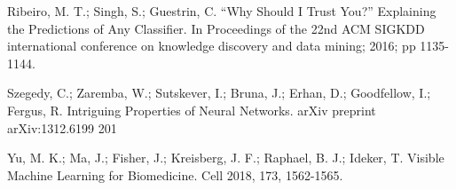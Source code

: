 \documentclass[12pt]{article}
\begin{document}
\begin{thebibliography}{20}
 Ribeiro, M. T.; Singh, S.; Guestrin, C. “Why Should I Trust You?” Explaining the Predictions of Any Classiﬁer. In Proceedings of the 22nd ACM SIGKDD international conference on knowledge discovery and data mining; 2016; pp 1135-1144.

 Szegedy, C.; Zaremba, W.; Sutskever, I.; Bruna, J.; Erhan, D.; Goodfellow, I.; Fergus, R. Intriguing Properties of Neural Networks. arXiv preprint arXiv:1312.6199 201

 Yu, M. K.; Ma, J.; Fisher, J.; Kreisberg, J. F.; Raphael, B. J.; Ideker, T. Visible Machine Learning for Biomedicine. Cell 2018, 173, 1562-1565.




\end{thebibliography}
\end{document}
